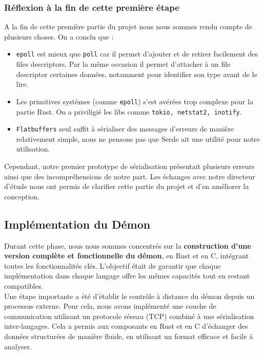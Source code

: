 \documentclass{article}
\begin{document}
\subsubsection{Réflexion à la fin de cette première étape}

A la fin de cette première partie du projet nous nous sommes rendu compte de plusieurs choses. On a conclu que : 
\begin{itemize}
    \item \texttt{epoll} est mieux que \texttt{poll} car il permet d'ajouter et de retirer facilement des files descriptors. Par la même occasion il permet d’attacher à un file descriptor certaines données, notamment pour identifier son type avant de le lire.
    \item Les primitives systèmes (comme \texttt{epoll}) s'est avérées trop complexe pour la partie Rust. On a priviligié les libs comme \texttt{tokio, netstat2, inotify}.
    \item \texttt{Flatbuffers} seul suffit à sérialiser des messages d’erreurs de manière relativement simple, nous ne pensons pas que Serde ait une utilité pour notre utilisation.
\end{itemize}

Cependant, notre premier prototype de sérialisation présentait plusieurs erreurs ainsi que des incompréhensions de notre part. Les échanges avec notre directeur d’étude nous ont permis de clarifier cette partie du projet et d’en améliorer la conception.

\subsection{Implémentation du Démon}


Durant cette phase, nous nous sommes concentrés sur la \textbf{construction d’une version complète et fonctionnelle du démon}, en Rust et en C, intégrant toutes les fonctionnalités clés. L’objectif était de garantir que chaque implémentation dans chaque langage offre les mêmes capacités tout en restant compatibles.\\

Une étape importante a été d’établir le contrôle à distance du démon depuis un processus externe. Pour cela, nous avons implémenté une couche de communication utilisant un protocole réseau (TCP) combiné à une sérialisation inter-langages. Cela a permis aux composants en Rust et en C d’échanger des données structurées de manière fluide, en utilisant un format efficace et facile à analyser.\\
\end{document}
